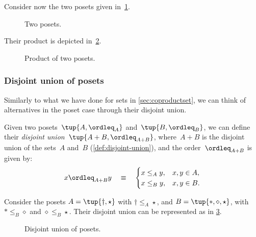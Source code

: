 \begin{example}
Consider now the two posets given in~\cref{fig:composing_posets_1}.
\begin{figure}[h!]
\begin{center}
\end{center}
\caption{Two posets. \label{fig:composing_posets_1}}
\end{figure}
Their product is depicted in~\cref{fig:composing_posets_2}.
\begin{figure}[h!]
\begin{center}
\end{center}
\caption{Product of two posets. \label{fig:composing_posets_2}}
\end{figure}
\end{example}

\subsubsection{Disjoint union of posets}

Similarly to what we have done for sets in \cref{sec:coproductset}, we can think of alternatives in the poset case through their disjoint union.

\begin{definition}
Given two posets~$\tup{A, \ordleq_A} $ and~$\tup{B, \ordleq_B}$, we can define their \emph{disjoint union}~$\tup{ A + B, \ordleq_{A + B}}$, where~$A + B$
is the disjoint union of the sets~$A$ and~$B$ (\cref{def:disjoint-union}), and the
order~$\ordleq_{A + B}$ is given by:
\begin{equation}
    x \ordleq_{A + B} y \quad\equiv\quad
    \begin{cases}
        x \leq_A y, & x,y \in A, \\
        x \leq_B y, & x,y \in B.
    \end{cases}
\end{equation}
\end{definition}


\begin{example}
Consider the posets $A=\tup{\dagger, \star}$ with $\dagger \leq_A \star$, and $B=\tup{\ast,\diamond,\star}$, with $\ast \leq_B \diamond$ and $\diamond \leq_B \star$. Their disjoint union can be represented as in \cref{fig:poset-coproduct}.

\begin{figure}[h!]
    \centering
    \caption{Disjoint union of posets. \label{fig:poset-coproduct}}
\end{figure}
\end{example}
